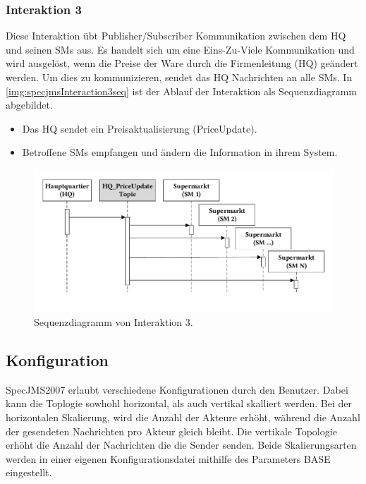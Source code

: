 \subsubsection{Interaktion 3}
Diese Interaktion übt Publisher/Subscriber Kommunikation zwischen dem HQ und seinen SMs aus. Es handelt sich um eine Eins-Zu-Viele Kommunikation und wird ausgelöst, wenn die Preise der Ware durch die Firmenleitung (HQ) geändert werden. Um dies zu kommunizieren, sendet das HQ Nachrichten an alle SMs. In \autoref{img:specjmsInteraction3seq} ist der Ablauf der Interaktion als Sequenzdiagramm abgebildet.
\begin{itemize}
    \item Das HQ sendet ein Preisaktualisierung (PriceUpdate).
    \item Betroffene SMs empfangen und ändern die Information in ihrem System.
\end{itemize}


\begin{figure}
\center
  \includegraphics[width=1\textwidth]{images/evaluation/specjms/evaluationInteraktion3seq.pdf}
  \caption{Sequenzdiagramm von Interaktion 3.}
  \label{img:specjmsInteraction3seq}
\end{figure}


\subsection{Konfiguration}
SpecJMS2007 erlaubt verschiedene Konfigurationen durch den Benutzer. Dabei kann die Toplogie sowhohl horizontal, als auch vertikal skalliert werden. Bei der horizontalen Skalierung, wird die Anzahl der Akteure erhöht, während die Anzahl der gesendeten Nachrichten pro Akteur gleich bleibt. Die vertikale Topologie erhöht die Anzahl der Nachrichten die die Sender senden. Beide Skalierungsarten werden in einer eigenen Konfigurationsdatei mithilfe des Parameters BASE eingestellt.

